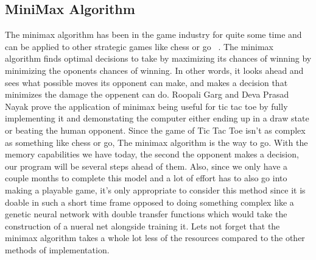 \documentclass[letterpaper]{article}
\begin{document}
\subsection{MiniMax Algorithm}
The minimax algorithm has been in the game industry for quite some time and can be applied to other strategic games like chess or go ~\cite {inproceedings}. The minimax algorithm finds optimal decisions to take by maximizing its chances of winning by minimizing the oponents chances of winning. In other words, it looks ahead and sees what possible moves its opponent can make, and makes a decision that minimizes the damage the oppenent can do. Roopali Garg and Deva Prasad Nayak prove the application of minimax being useful for tic tac toe by fully implementing it and demonstating the computer either ending up in a draw state or beating the human opponent. Since the game of Tic Tac Toe isn’t as complex as something like chess or go,  The minimax algorithm is the way to go. With the memory capabilities we have today, the second the opponent makes a decision, our program will be several steps ahead of them. Also, since we only have a couple months to complete this model and a lot of effort has to also go into making a playable game, it’s only appropriate to consider this method since it is doable in such a short time frame opposed to doing something complex like a genetic neural network with double transfer functions which would take the construction of a nueral net alongside training it. Lets not forget that the minimax algorithm takes a whole lot less of the resources compared to the other methods of implementation.   
\end{document}
